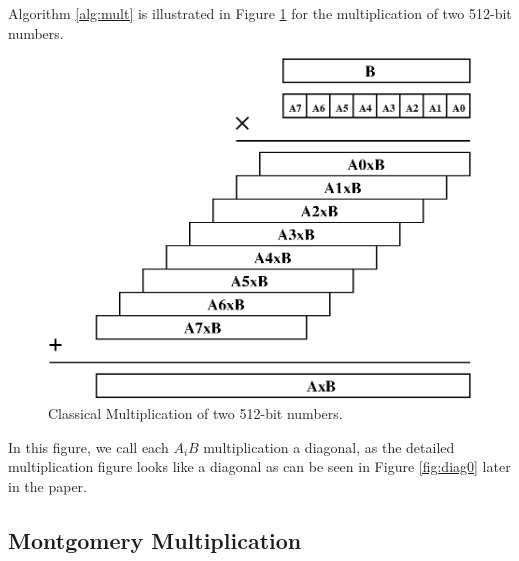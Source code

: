 \documentclass[twocolumn]{svjour3}          %
\begin{document}
Algorithm \ref{alg:mult} is illustrated in Figure \ref{fig:mult} for the multiplication of two 512-bit numbers.

\begin{figure}
\centering
  \includegraphics[scale=0.7]{mul.eps}
\caption{Classical Multiplication of two 512-bit numbers.  }
\label{fig:mult}
\end{figure}

In this figure, we call each $A_iB$ multiplication a diagonal, as the detailed multiplication figure looks like a diagonal as can be seen in Figure \ref{fig:diag0} later in the paper.

\subsection{Montgomery Multiplication}
\end{document}

